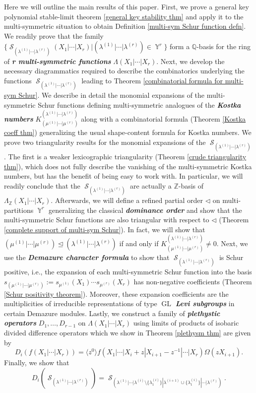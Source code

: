 \documentclass[12pt,reqno]{amsart}
\theoremstyle{definition}
\DeclareMathOperator{\Par}{\mathbb{Y}}
\DeclareMathOperator{\GL}{\mathrm{GL}}
\DeclareMathOperator{\cS}{\mathcal{S}}
\begin{document}
Here we will outline the main results of this paper. First, we prove a general key polynomial stable-limit theorem \ref{general key stability thm} and apply it to the multi-symmetric situation to obtain Definition \ref{multi-sym Schur function defn}. We readily prove that the family $\{ \cS_{(\lambda^{(1)}|\cdots| \lambda^{(r)})}(X_1|\cdots |X_r) | (\lambda^{(1)}|\cdots | \lambda^{(r)}) \in \Par^r\}$ form a $\mathbb{Q}$-basis for the ring of \textbf{\textit{r multi-symmetric functions}} $\Lambda(X_1|\cdots | X_r).$ Next, we develop the necessary diagrammatics required to describe the combinatorics underlying the functions $\cS_{(\lambda^{(1)}|\cdots| \lambda^{(r)})}$ leading to Theorem \ref{combinatorial formula for multi-sym Schur}. We describe in detail the monomial expansions of the multi-symmetric Schur functions defining multi-symmetric analogues of the \textbf{\textit{Kostka numbers}} $K_{(\mu^{(1)}|\cdots | \mu^{(r)})}^{(\lambda^{(1)}|\cdots| \lambda^{(r)})}$ along with a combinatorial formula (Theorem \ref{Kostka coeff thm}) generalizing the usual shape-content formula for Kostka numbers. We prove two triangularity results for the monomial expansions of the $\cS_{(\lambda^{(1)}|\cdots| \lambda^{(r)})}$. The first is a weaker lexicographic triangularity (Theorem \ref{crude triangularity thm}), which does not fully describe the vanishing of the multi-symmetric Kostka numbers, but has the benefit of being easy to work with. In particular, we will readily conclude that the $\cS_{(\lambda^{(1)}|\cdots| \lambda^{(r)})}$ are actually a $\mathbb{Z}$-basis of $\Lambda_{\mathbb{Z}}(X_1|\cdots |X_r).$ Afterwards, we will define a refined partial order $\triangleleft$ on multi-partitions $\Par^r$ generalizing the classical \textbf{\textit{dominance order}} and show that the multi-symmetric Schur functions are also triangular with respect to $\triangleleft$ (Theorem \ref{complete support of multi-sym Schur}). In fact, we will show that $(\mu^{(1)}|\cdots | \mu^{(r)}) \trianglelefteq (\lambda^{(1)}|\cdots | \lambda^{(r)})$ if and only if $K_{(\mu^{(1)}|\cdots | \mu^{(r)})}^{(\lambda^{(1)}|\cdots| \lambda^{(r)})} \neq 0.$ Next, we use the \textbf{\textit{Demazure character formula}} to show that $\cS_{(\lambda^{(1)}|\cdots| \lambda^{(r)})}$ is Schur positive, i.e., the expansion of each multi-symmetric Schur function into the basis $s_{(\mu^{(1)}|\cdots |\mu^{(r)})}:= s_{\mu^{(1)}}(X_1)\cdots s_{\mu^{(r)}}(X_r)$ has non-negative coefficients (Theorem \ref{Schur positivity theorem}). Moreover, these expansion coefficients are the multiplicities of irreducible representations of type $\GL$ \textbf{\textit{Levi subgroups}} in certain Demazure modules. Lastly, we construct a family of \textbf{\textit{plethystic operators}} $D_1,\ldots,D_{r-1}$ on $\Lambda(X_1|\cdots | X_r)$ using limits of products of isobaric divided difference operators which we show in Theorem \ref{plethysm thm} are given by  
$$D_i(f(X_1|\cdots|X_r))= \langle z^0 \rangle f(X_1|\cdots | X_i+z|X_{i+1}-z^{-1}|\cdots |X_r) \Omega(zX_{i+1}).$$ Finally, we show that
$$D_i\left(\cS_{(\lambda^{(1)}|\cdots |\lambda^{(r)})} \right) = \cS_{(\lambda^{(1)}|\cdots|\lambda^{(i)}\setminus \{\lambda^{(i)}_{1}\}|\lambda^{(i+1)} \cup \{\lambda^{(i)}_{1}\}|\cdots |\lambda^{(r)})}.$$
\end{document}
